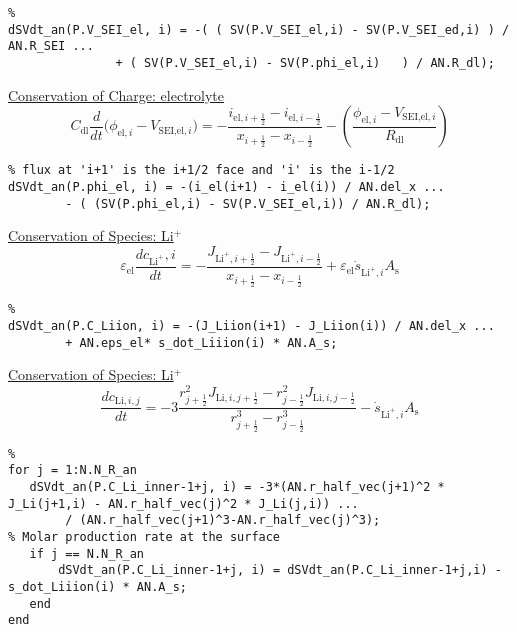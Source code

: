 \documentclass[12pt]{article}
\begin{document}
\fontsize{8}{12}\selectfont
\begin{lstlisting}
%
dSVdt_an(P.V_SEI_el, i) = -( ( SV(P.V_SEI_el,i) - SV(P.V_SEI_ed,i) ) / AN.R_SEI ...
		   	   + ( SV(P.V_SEI_el,i) - SV(P.phi_el,i)   ) / AN.R_dl);
\end{lstlisting}
\fontsize{12}{12}\selectfont
\underline{Conservation of Charge: electrolyte}
	\begin{equation}
		C_\text{dl}\frac{d }{dt}\Big(\phi_{\text{el},i} - V_{\text{SEI,el},i}\Big) = -\frac{ i_{\text{el},{i+\frac{1}{2}}} - i_{\text{el},{i-\frac{1}{2}}} }{x_{i+\frac{1}{2}} - x_{i-\frac{1}{2}}} -\left(\frac{\phi_{\text{el},i} - V_{\text{SEI,el},i}}{R_\text{dl}} \right)
	\end{equation}
\fontsize{8}{12}\selectfont
\begin{lstlisting}
% flux at 'i+1' is the i+1/2 face and 'i' is the i-1/2
dSVdt_an(P.phi_el, i) = -(i_el(i+1) - i_el(i)) / AN.del_x ...
		- ( (SV(P.phi_el,i) - SV(P.V_SEI_el,i)) / AN.R_dl);
\end{lstlisting}
\fontsize{12}{12}\selectfont
\underline{Conservation of Species: Li$^+$}
	\begin{equation}
		\varepsilon_{\text{el}}  \frac{dc_{\text{Li}^+},i}{dt} = -\frac{ J_{\text{Li}^+,i+\frac{1}{2}} - J_{\text{Li}^+,i-\frac{1}{2}} }{x_{i+\frac{1}{2}} - x_{i-\frac{1}{2}}} + \varepsilon_{\text{el}} \dot{s}_{\text{Li}^+,i}A_\text{s}
	\end{equation}
\fontsize{8}{12}\selectfont
\begin{lstlisting}
%
dSVdt_an(P.C_Liion, i) = -(J_Liion(i+1) - J_Liion(i)) / AN.del_x ...
		+ AN.eps_el* s_dot_Liiion(i) * AN.A_s;
\end{lstlisting}
\fontsize{12}{12}\selectfont
\underline{Conservation of Species: Li$^+$}
	\begin{equation}
		\frac{dc_{\text{Li},i,j}}{dt}  = -3\frac{  r_{j+\frac{1}{2}}^2 J_{\text{Li},i,j+\frac{1}{2}}  -  r_{j-\frac{1}{2}}^2  J_{\text{Li},i,j-\frac{1}{2}}   }{r_{j+\frac{1}{2}}^3 - r_{j-\frac{1}{2}}^3} -  \dot{s}_{\text{Li}^+,i}A_\text{s}
	\end{equation}
\fontsize{8}{12}\selectfont
\begin{lstlisting}
%
for j = 1:N.N_R_an
   dSVdt_an(P.C_Li_inner-1+j, i) = -3*(AN.r_half_vec(j+1)^2 * J_Li(j+1,i) - AN.r_half_vec(j)^2 * J_Li(j,i)) ...
		/ (AN.r_half_vec(j+1)^3-AN.r_half_vec(j)^3);
% Molar production rate at the surface
   if j == N.N_R_an
	   dSVdt_an(P.C_Li_inner-1+j, i) = dSVdt_an(P.C_Li_inner-1+j,i) -  s_dot_Liiion(i) * AN.A_s;
   end
end
\end{lstlisting}
\end{document}
